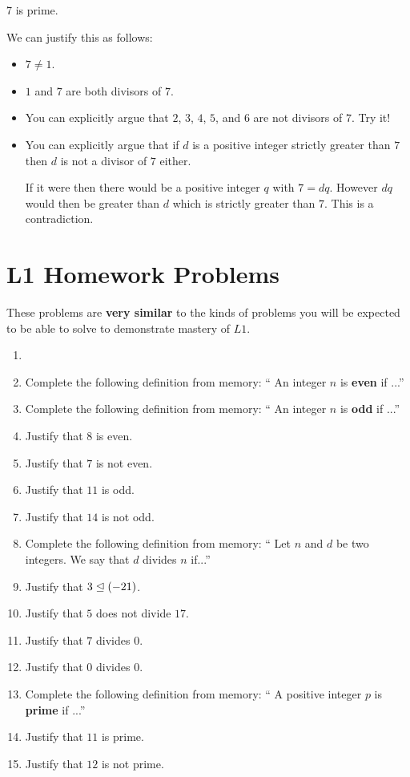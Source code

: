 \begin{example}
	7 is prime. 
	
	We can justify this as follows:
	
	\begin{itemize}
		\item $7 \neq 1$.
		\item $1$ and $7$ are both divisors of $7$.
		\item You can explicitly argue that $2$, $3$, $4$, $5$, and $6$ are not divisors of $7$.  Try it!
		\item You can explicitly argue that if  $d$ is a positive integer strictly greater than $7$ then $d$ is not a divisor of $7$ either.
		
		If it were then there would be a positive integer $q$ with $7 = dq$.  However $dq$ would then be greater than $d$ which is strictly greater than $7$.  This is a contradiction.
	\end{itemize}
\end{example}

\newpage

\section{L1 Homework Problems}

 These problems are \textbf{very similar} to the kinds of problems you will be expected to be able to solve to demonstrate mastery of $L1$.

\begin{xca}
\begin{enumerate}
			\item[]\mbox{}\\
		\item Complete the following definition from memory:  `` An integer $n$ is \textbf{even} if ...''
		\item Complete the following definition from memory:  `` An integer $n$ is \textbf{odd} if ...''
		\item Justify that $8$ is even.
		\item Justify that $7$ is not even.
		\item Justify that $11$ is odd.
		\item Justify that $14$ is not odd.
		\item Complete the following definition from memory:  `` Let $n$ and $d$ be two integers.  We say that  $d$ divides $n$ if...''
		\item Justify that $3 \trianglelefteq (-21)$.
		\item Justify that $5$ does not divide $17$.
		\item Justify that $7$ divides $0$.
		\item Justify that $0$ divides $0$.
		\item Complete the following definition from memory:  `` A positive integer $p$ is \textbf{prime} if ...''
		\item Justify that $11$ is prime.
		\item Justify that $12$ is not prime.  
	\end{enumerate}
\end{xca}

